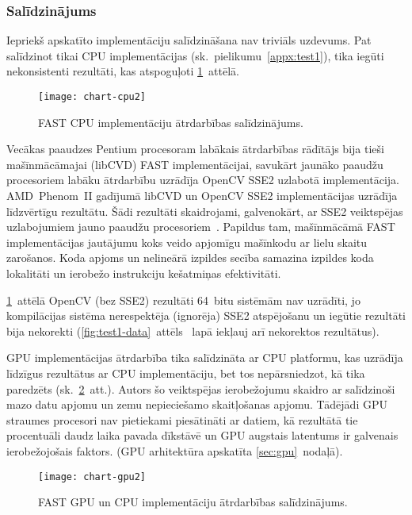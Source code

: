 \subsubsection{Salīdzinājums} \label{sec:fast-compare}
Iepriekš apskatīto implementāciju salīdzināšana nav triviāls uzdevums.
Pat salīdzinot tikai CPU implementācijas (sk.~pielikumu~\ref{appx:test1}),
tika iegūti nekonsistenti rezultāti, kas atspoguļoti
\ref{fig:test1-data-txt}~attēlā.
\begin{figure}[tbh]
	\centering
	\texttt{[image: chart-cpu2]}
	\caption{FAST CPU implementāciju ātrdarbības salīdzinājums.}
	\label{fig:test1-data-txt}
\end{figure}

Vecākas paaudzes Pentium procesoram labākais ātrdarbības rādītājs bija tieši
mašīnmācāmajai (libCVD) FAST implementācijai, savukārt jaunāko paaudžu
procesoriem labāku ātrdarbību uzrādīja OpenCV SSE2 uzlabotā implementācija.
AMD~Phenom~II gadījumā libCVD un OpenCV SSE2 implementācijas uzrādīja
līdzvērtīgu rezultātu.
Šādi rezultāti skaidrojami, galvenokārt, ar SSE2 veiktspējas uzlabojumiem
jauno paaudžu procesoriem~\cite{Core2}. Papildus tam, mašīnmācāmā FAST
implementācijas jautājumu koks veido apjomīgu mašīnkodu ar lielu skaitu
zarošanos. Koda apjoms un nelineārā izpildes secība samazina izpildes koda
lokalitāti un ierobežo instrukciju kešatmiņas efektivitāti.

\ref{fig:test1-data-txt}~attēlā OpenCV (bez SSE2) rezultāti 64~bitu
sistēmām nav uzrādīti, jo kompilācijas sistēma nerespektēja (ignorēja)
SSE2 atspējošanu un iegūtie rezultāti bija nekorekti
(\ref{fig:test1-data}~attēls \pageref{fig:test1-data}~lapā iekļauj arī nekorektos
rezultātus).

GPU implementācijas ātrdarbība tika salīdzināta ar CPU platformu,
kas uzrādīja līdzīgus rezultātus ar CPU implementāciju, bet tos
nepārsniedzot, kā tika paredzēts (sk.~\ref{fig:test2-data-txt}~att.).
Autors šo veiktspējas
ierobežojumu skaidro ar salīdzinoši mazo datu apjomu un
zemu nepieciešamo skaitļošanas apjomu. Tādējādi GPU straumes
procesori nav pietiekami piesātināti ar datiem, kā rezultātā tie
procentuāli daudz laika pavada dīkstāvē un
GPU augstais latentums ir galvenais ierobežojošais faktors.
(GPU arhitektūra apskatīta \ref{sec:gpu}~nodaļā).
\begin{figure}[tbh]
	\centering
	\texttt{[image: chart-gpu2]}
	\caption{FAST GPU un CPU implementāciju ātrdarbības salīdzinājums.}
	\label{fig:test2-data-txt}
\end{figure}

